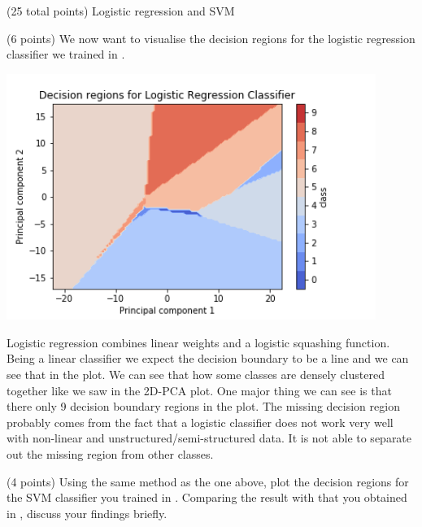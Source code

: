 \documentclass[12pt]{article}
\begin{document}
\begin{question}{(25 total points) Logistic regression and SVM}
\begin{subquestion}
   \end{subquestion}
   \begin{subquestion}{(6 points)
       We now want to visualise the decision regions for the logistic
       regression classifier we trained in .
     } \label{Q2.3}


   

      \begin{answerbox}{35em}
         \begin{center}
             \includegraphics[width=0.9\textwidth]{results/2_3.png}
         \end{center}
         Logistic regression combines linear weights and a logistic squashing function. Being a linear classifier we expect the decision boundary to be a line and we can see that in the plot. We can see that how some classes are densely clustered together like we saw in the 2D-PCA plot. One major thing we can see is that there only 9 decision boundary regions in the plot. The missing decision region probably comes from the fact that a logistic classifier does not work very well with non-linear and unstructured/semi-structured data. It is not able to separate out the missing region from other classes.
      \end{answerbox}
  


   \end{subquestion}
   \begin{subquestion}{(4 points)
       Using the same method as the one above, plot the decision regions for
       the SVM classifier you trained in .
       Comparing the result with that you obtained in , discuss your
       findings briefly.
     } \label{Q2.4}
   


\end{subquestion}
\end{question}
\end{document}
